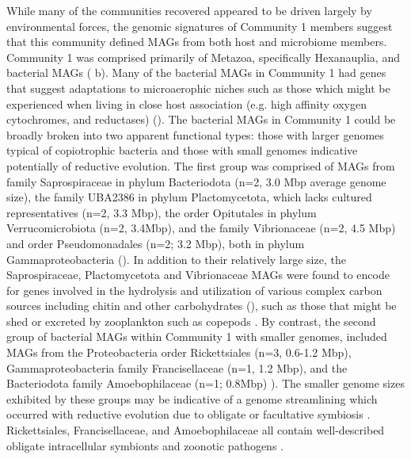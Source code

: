 \documentclass[12pt]{article}
\numberwithin{equation}{section}
\begin{document}
While many of the communities recovered appeared to be driven largely by environmental forces, the genomic signatures of Community 1 members suggest that this community defined MAGs from both host and microbiome members. Community 1 was comprised primarily of Metazoa, specifically Hexanauplia, and bacterial MAGs ( b). Many of the bacterial MAGs in Community 1 had genes that suggest adaptations to microaerophic niches such as those which might be experienced when living in close host association (e.g. high affinity oxygen cytochromes, and reductases) (). The bacterial MAGs in Community 1 could be broadly broken into two apparent functional types: those with larger genomes typical of copiotrophic bacteria and those with small genomes indicative potentially of reductive evolution.  The first group was comprised of MAGs from family Saprospiraceae in phylum Bacteriodota (n=2, 3.0 Mbp average genome size), the family UBA2386 in phylum Plactomycetota, which lacks cultured representatives (n=2, 3.3 Mbp), the order Opitutales in phylum Verrucomicrobiota (n=2, 3.4Mbp),  and the family Vibrionaceae (n=2, 4.5 Mbp) and order Pseudomonadales (n=2; 3.2 Mbp), both in phylum Gammaproteobacteria (). In addition to their relatively large size, the Saprospiraceae, Plactomycetota and Vibrionaceae MAGs were found to encode for  genes involved in the hydrolysis and utilization of various complex carbon sources including chitin and other carbohydrates (), such as those that might be shed or excreted by zooplankton such as copepods \citep{De_Corte_2017}.  By contrast, the second group of bacterial MAGs within Community 1 with smaller genomes, included MAGs from the Proteobacteria order Rickettsiales (n=3, 0.6-1.2 Mbp), Gammaproteobacteria family Francisellaceae (n=1, 1.2 Mbp), and the Bacteriodota family Amoebophilaceae (n=1; 0.8Mbp) ).  The smaller genome sizes exhibited by these groups may be indicative of a genome streamlining which occurred with reductive evolution due to obligate or facultative symbiosis \citep{Giovannoni_2014}. Rickettsiales, Francisellaceae, and Amoebophilaceae all contain well-described obligate intracellular symbionts \citep{Santos_Garcia_2014, Darby_2007, Li_2021} and zoonotic pathogens \citep{ Celli_2013, Darby_2007}. 
\end{document}
